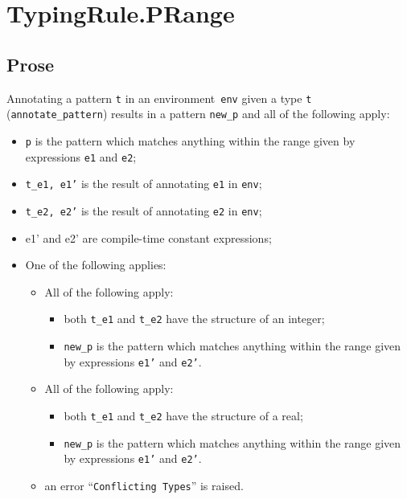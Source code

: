 \documentclass{book}
\begin{document}
\section{TypingRule.PRange \label{sec:TypingRule.PRange}}

    \subsection{Prose}
   Annotating a pattern \texttt{t} in an environment~\texttt{env} given a type \texttt{t} (\texttt{annotate\_pattern}) results in a pattern \texttt{new\_p} and all of the following apply:
   \begin{itemize}
   \item \texttt{p} is the pattern which matches anything within the range given by
      expressions \texttt{e1} and \texttt{e2};
   \item \texttt{t\_e1, e1'} is the result of annotating \texttt{e1} in \texttt{env};
   \item \texttt{t\_e2, e2'} is the result of annotating \texttt{e2} in \texttt{env};
   \item e1' and e2' are compile-time constant expressions; 
   \item One of the following applies:
     \begin{itemize}
     \item All of the following apply:
           \begin{itemize}
           \item both \texttt{t\_e1} and \texttt{t\_e2} have the structure of an integer;
           \item \texttt{new\_p} is the pattern which matches anything within the range given by
      expressions \texttt{e1'} and \texttt{e2'}.
           \end{itemize}
     \item All of the following apply:
           \begin{itemize}
           \item both \texttt{t\_e1} and \texttt{t\_e2} have the structure of a real;
           \item \texttt{new\_p} is the pattern which matches anything within the range given by
      expressions \texttt{e1'} and \texttt{e2'}.
           \end{itemize}
     \item an error ``\texttt{Conflicting Types}'' is raised.
     \end{itemize}
   \end{itemize}
\end{document}
